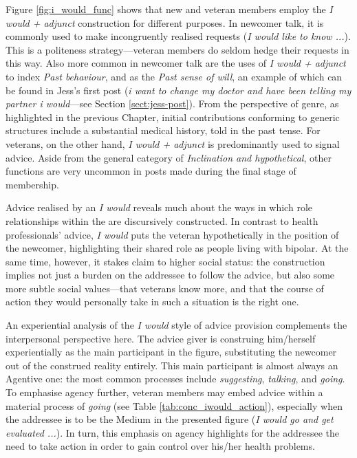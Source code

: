 Figure \ref{fig:i_would_func} shows that new and veteran members employ the \emph{I would + adjunct} construction for different purposes. In newcomer talk, it is commonly used to make incongruently realised requests (\emph{I would like to know ...}). This is a politeness strategy---veteran members do seldom hedge their requests in this way. Also more common in newcomer talk are the uses of \emph{I would + adjunct} to index \emph{Past behaviour}, and as the \emph{Past sense of will}, an example of which can be found in Jess's first \gls{post} (\emph{i want to change my doctor and have been telling my partner i would}---see Section \ref{sect:jess-post}). From the perspective of genre, as highlighted in the previous Chapter, initial contributions conforming to generic structures include a substantial medical history, told in the past tense. For veterans, on the other hand, \emph{I would + adjunct} is predominantly used to signal advice. Aside from the general category of \emph{Inclination and hypothetical}, other functions are very uncommon in \glspl{post} made during the final stage of membership.


Advice realised by an \emph{I would} reveals much about the ways in which role relationships within the  are discursively constructed. In contrast to health professionals' advice, \emph{I would} puts the veteran hypothetically in the position of the newcomer, highlighting their shared role as people living with \gls{bipolar}. At the same time, however, it stakes claim to higher social status: the construction implies not just a burden on the addressee to follow the advice, but also some more subtle social values---that veterans know more, and that the course of action they would personally take in such a situation is the right one. 

An experiential analysis of the \emph{I would} style of advice provision complements the interpersonal perspective here. The advice giver is construing him\slash herself experientially as the main participant in the figure, substituting the newcomer out of the construed reality entirely. This main participant is almost always an Agentive one: the most common processes include \emph{suggesting}, \emph{talking}, and \emph{going}. To emphasise agency further, veteran \glspl{member} may embed advice within a material process of \emph{going} (see Table \ref{tab:conc_iwould_action}), especially when the addressee is to be the Medium in the presented figure (\emph{I would go and get evaluated ...}). In turn, this emphasis on agency highlights for the addressee the need to take action in order to gain control over his\slash her health problems.

